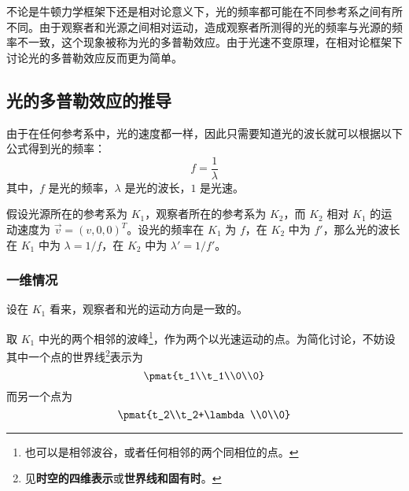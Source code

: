 

不论是牛顿力学框架下还是相对论意义下，光的频率都可能在不同参考系之间有所不同。由于观察者和光源之间相对运动，造成观察者所测得的光的频率与光源的频率不一致，这个现象被称为光的多普勒效应。由于光速不变原理，在相对论框架下讨论光的多普勒效应反而更为简单。




\subsection{光的多普勒效应的推导}
由于在任何参考系中，光的速度都一样，因此只需要知道光的波长就可以根据以下公式得到光的频率：
\begin{equation}
f=\frac{1}{\lambda}
\end{equation}
其中，$f$ 是光的频率，$\lambda$ 是光的波长，$1$ 是光速。

假设光源所在的参考系为 $K_1$，观察者所在的参考系为 $K_2$，而 $K_2$ 相对 $K_1$ 的运动速度为 $\vec{v}=(v, 0, 0)^T$。设光的频率在 $K_1$ 为 $f$，在 $K_2$ 中为 $f'$，那么光的波长在 $K_1$ 中为 $\lambda=1/f$，在 $K_2$ 中为 $\lambda'=1/f'$。

\subsubsection{一维情况}
设在 $K_1$ 看来，观察者和光的运动方向是一致的。

取 $K_1$ 中光的两个相邻的波峰\footnote{也可以是相邻波谷，或者任何相邻的两个同相位的点。}，作为两个以光速运动的点。为简化讨论，不妨设其中一个点的世界线\footnote{见\textbf{时空的四维表示}或\textbf{世界线和固有时}。}表示为
\begin{equation}
\pmat{t_1\\t_1\\0\\0}
\end{equation}
而另一个点为
\begin{equation}
\pmat{t_2\\t_2+\lambda\\0\\0}
\end{equation}


